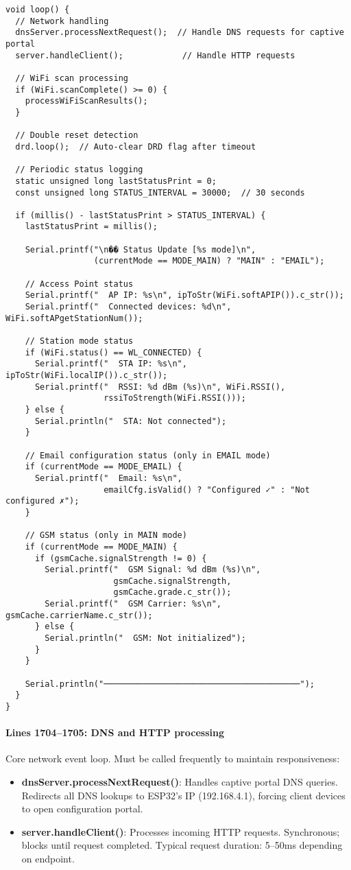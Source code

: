 \documentclass[11pt,a4paper]{article}
\begin{document}
\begin{verbatim}
void loop() {
  // Network handling
  dnsServer.processNextRequest();  // Handle DNS requests for captive portal
  server.handleClient();            // Handle HTTP requests
  
  // WiFi scan processing
  if (WiFi.scanComplete() >= 0) {
    processWiFiScanResults();
  }
  
  // Double reset detection
  drd.loop();  // Auto-clear DRD flag after timeout
  
  // Periodic status logging
  static unsigned long lastStatusPrint = 0;
  const unsigned long STATUS_INTERVAL = 30000;  // 30 seconds
  
  if (millis() - lastStatusPrint > STATUS_INTERVAL) {
    lastStatusPrint = millis();
    
    Serial.printf("\n�� Status Update [%s mode]\n", 
                  (currentMode == MODE_MAIN) ? "MAIN" : "EMAIL");
    
    // Access Point status
    Serial.printf("  AP IP: %s\n", ipToStr(WiFi.softAPIP()).c_str());
    Serial.printf("  Connected devices: %d\n", WiFi.softAPgetStationNum());
    
    // Station mode status
    if (WiFi.status() == WL_CONNECTED) {
      Serial.printf("  STA IP: %s\n", ipToStr(WiFi.localIP()).c_str());
      Serial.printf("  RSSI: %d dBm (%s)\n", WiFi.RSSI(), 
                    rssiToStrength(WiFi.RSSI()));
    } else {
      Serial.println("  STA: Not connected");
    }
    
    // Email configuration status (only in EMAIL mode)
    if (currentMode == MODE_EMAIL) {
      Serial.printf("  Email: %s\n", 
                    emailCfg.isValid() ? "Configured ✓" : "Not configured ✗");
    }
    
    // GSM status (only in MAIN mode)
    if (currentMode == MODE_MAIN) {
      if (gsmCache.signalStrength != 0) {
        Serial.printf("  GSM Signal: %d dBm (%s)\n", 
                      gsmCache.signalStrength, 
                      gsmCache.grade.c_str());
        Serial.printf("  GSM Carrier: %s\n", gsmCache.carrierName.c_str());
      } else {
        Serial.println("  GSM: Not initialized");
      }
    }
    
    Serial.println("────────────────────────────────────────");
  }
}
\end{verbatim}

\paragraph{Lines 1704--1705: DNS and HTTP processing}
Core network event loop. Must be called frequently to maintain responsiveness:
\begin{itemize}[leftmargin=*]
  \item \textbf{dnsServer.processNextRequest()}: Handles captive portal DNS queries. Redirects all DNS lookups to ESP32's IP (192.168.4.1), forcing client devices to open configuration portal.
  \item \textbf{server.handleClient()}: Processes incoming HTTP requests. Synchronous; blocks until request completed. Typical request duration: 5--50ms depending on endpoint.
\end{itemize}
\end{document}

